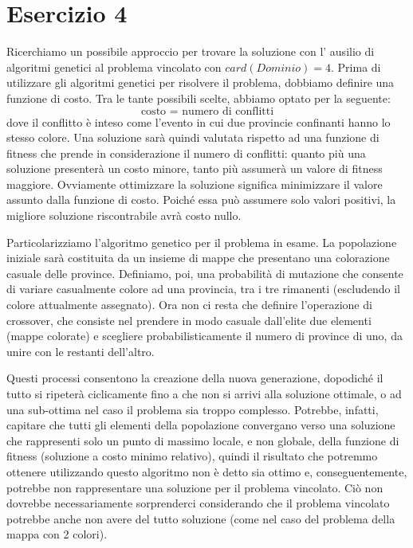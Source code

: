 	\section{Esercizio 4}
		\label{sec:es4}
		Ricerchiamo un possibile approccio per trovare la soluzione con l' ausilio di algoritmi genetici al problema vincolato con $card(Dominio)=4$. Prima di utilizzare gli algoritmi genetici per risolvere il problema, dobbiamo definire una funzione di costo. Tra le tante possibili scelte, abbiamo optato per la seguente: 
		\begin{equation*}
			\mbox{costo }=\mbox{ numero di conflitti}
		\end{equation*}
		dove il conflitto è inteso come l'evento in cui due provincie confinanti hanno lo stesso colore. Una soluzione sarà quindi valutata rispetto ad una funzione di fitness che prende in considerazione il numero di conflitti: quanto più una soluzione presenterà un costo minore, tanto più assumerà un valore di fitness maggiore. Ovviamente ottimizzare la soluzione significa minimizzare il valore assunto dalla funzione di costo. Poiché essa può assumere solo valori positivi, la migliore soluzione riscontrabile avrà costo nullo.\par
		Particolarizziamo l'algoritmo genetico per il problema in esame. La popolazione iniziale sarà costituita da un insieme di mappe che presentano una colorazione casuale delle province. Definiamo, poi, una probabilità di mutazione che consente di variare casualmente colore ad una provincia, tra i tre rimanenti (escludendo il colore attualmente assegnato). 
		Ora non ci resta che definire l'operazione di crossover, che consiste nel prendere in modo casuale dall'elite due elementi (mappe colorate) e scegliere probabilisticamente il numero di province di uno, da unire con le restanti dell'altro.\par
		Questi processi consentono la creazione della nuova generazione, dopodiché il tutto si ripeterà ciclicamente fino a che non si arrivi alla soluzione ottimale, o ad una sub-ottima nel caso il problema sia troppo complesso. Potrebbe, infatti, capitare che tutti gli elementi della popolazione convergano verso una soluzione che rappresenti solo un punto di massimo locale, e non globale, della funzione di fitness (soluzione a costo minimo relativo), quindi il risultato che potremmo ottenere utilizzando questo algoritmo non è detto sia ottimo e, conseguentemente, potrebbe non rappresentare una soluzione per il problema vincolato. Ciò non dovrebbe necessariamente sorprenderci considerando che il problema vincolato potrebbe anche non avere del tutto soluzione (come nel caso del problema della mappa con 2 colori).\par
